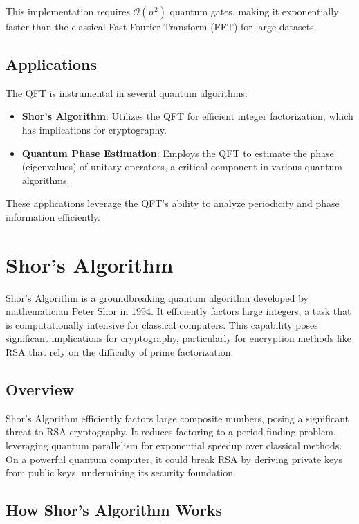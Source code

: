 \documentclass{article}
\begin{document}
This implementation requires $\mathcal{O}(n^2)$ quantum gates, making it exponentially faster than the classical Fast Fourier Transform (FFT) for large datasets.

\subsection{Applications}

The QFT is instrumental in several quantum algorithms:

\begin{itemize}
    \item \textbf{Shor's Algorithm}: Utilizes the QFT for efficient integer factorization, which has implications for cryptography.
    \item \textbf{Quantum Phase Estimation}: Employs the QFT to estimate the phase (eigenvalues) of unitary operators, a critical component in various quantum algorithms.
\end{itemize}

These applications leverage the QFT's ability to analyze periodicity and phase information efficiently.

\section{Shor's Algorithm}

Shor's Algorithm is a groundbreaking quantum algorithm developed by mathematician Peter Shor in 1994. It efficiently factors large integers, a task that is computationally intensive for classical computers. This capability poses significant implications for cryptography, particularly for encryption methods like RSA that rely on the difficulty of prime factorization.

\subsection{Overview}

Shor's Algorithm efficiently factors large composite numbers, posing a significant threat to RSA cryptography. It reduces factoring to a period-finding problem, leveraging quantum parallelism for exponential speedup over classical methods. On a powerful quantum computer, it could break RSA by deriving private keys from public keys, undermining its security foundation.

\subsection{How Shor's Algorithm Works}
\end{document}
